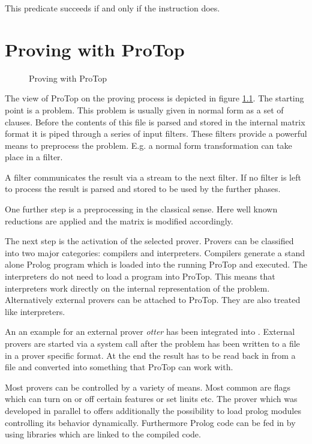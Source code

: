 This predicate succeeds if and only if the instruction does.




\chapter{Proving with ProTop}%
\begin{figure}
  \begin{center}
    \mbox{}
    \caption{Proving with ProTop}\label{fig:skeleton}
  \end{center}
\end{figure}

The view of ProTop on the proving process is depicted in figure
\ref{fig:skeleton}. The starting point is a problem. This problem is usually
given in normal form as a set of clauses. Before the contents of this file is
parsed and stored in the internal matrix format it is piped through a series
of input filters. These filters provide a powerful means to preprocess the
problem. E.g. a normal form transformation can take place in a filter.

A filter communicates the result via a stream to the next filter. If no filter
is left to process the result is parsed and stored to be used by the further
phases.

One further step is a preprocessing in the classical sense. Here well known
reductions are applied and the matrix is modified accordingly.

The next step is the activation of the selected prover. Provers can be
classified into two major categories: compilers and interpreters. Compilers
generate a stand alone Prolog program which is loaded into the running ProTop
and executed.  The interpreters do not need to load a program into ProTop.
This means that interpreters work directly on the internal representation of
the problem. Alternatively external provers can be attached to ProTop. They
are also treated like interpreters.

An an example for an external prover {\em otter} has been integrated into
\ProTop. External provers are started via a system call after the problem has
been written to a file in a prover specific format. At the end the result has
to be read back in from a file and converted into something that ProTop can
work with.

Most provers can be controlled by a variety of means. Most common are flags
which can turn on or off certain features or set linits etc. The prover
\ProCom{} which was developed in parallel to \ProTop{} offers additionally the
possibility to load prolog modules controlling its behavior dynamically.
Furthermore Prolog code can be fed in by using libraries which are linked to
the compiled code.

%
